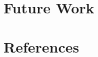 \documentclass{article}
\begin{document}
\section{Future Work}



\section{References}



%
%
%
%
\end{document}
